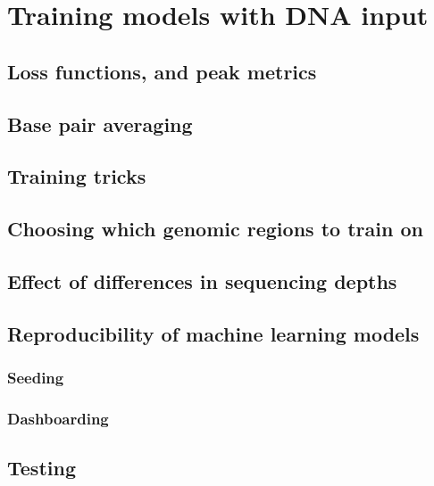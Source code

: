\documentclass[
]{book}
\begin{document}
\part{Training models with DNA input}\label{part-training-models-with-dna-input}

\chapter{Loss functions, and peak metrics}\label{loss-functions-and-peak-metrics}

\chapter{Base pair averaging}\label{base-pair-averaging}

\chapter{Training tricks}\label{training-tricks}

\chapter{Choosing which genomic regions to train on}\label{choosing-which-genomic-regions-to-train-on}

\chapter{Effect of differences in sequencing depths}\label{effect-of-differences-in-sequencing-depths}

\chapter{Reproducibility of machine learning models}\label{reproducibility-of-machine-learning-models}

\section{Seeding}\label{seeding}

\section{Dashboarding}\label{dashboarding}

\chapter{Testing}\label{testing}
\end{document}
